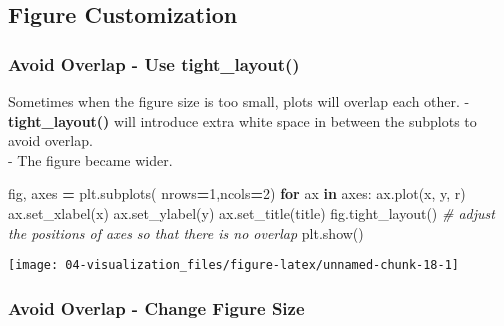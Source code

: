\documentclass[
]{book}
\newenvironment{Shaded}{\begin{snugshade}}{\end{snugshade}}
\newcommand{\CommentTok}[1]{\textcolor[rgb]{0.37,0.37,0.37}{\textit{#1}}}
\newcommand{\ControlFlowTok}[1]{\textcolor[rgb]{0.27,0.27,0.27}{\textbf{#1}}}
\newcommand{\DecValTok}[1]{\textcolor[rgb]{0.06,0.06,0.06}{#1}}
\newcommand{\KeywordTok}[1]{\textcolor[rgb]{0.27,0.27,0.27}{\textbf{#1}}}
\newcommand{\NormalTok}[1]{#1}
\newcommand{\OperatorTok}[1]{\textcolor[rgb]{0.43,0.43,0.43}{\textbf{#1}}}
\newcommand{\StringTok}[1]{\textcolor[rgb]{0.5,0.5,0.5}{#1}}
\begin{document}
\hypertarget{figure-customization}{%
\subsection{Figure Customization}\label{figure-customization}}

\hypertarget{avoid-overlap---use-tight_layout}{%
\subsubsection{Avoid Overlap - Use tight\_layout()}\label{avoid-overlap---use-tight_layout}}

Sometimes when the figure size is too small, plots will overlap each other. - \textbf{tight\_layout()} will introduce extra white space in between the subplots to avoid overlap.\\
- The figure became wider.

\begin{Shaded}
\begin{Highlighting}[]
\NormalTok{fig, axes }\OperatorTok{=}\NormalTok{ plt.subplots( nrows}\OperatorTok{=}\DecValTok{1}\NormalTok{,ncols}\OperatorTok{=}\DecValTok{2}\NormalTok{)}
\ControlFlowTok{for}\NormalTok{ ax }\KeywordTok{in}\NormalTok{ axes:}
\NormalTok{    ax.plot(x, y, }\StringTok{\textquotesingle{}r\textquotesingle{}}\NormalTok{)}
\NormalTok{    ax.set\_xlabel(}\StringTok{\textquotesingle{}x\textquotesingle{}}\NormalTok{)}
\NormalTok{    ax.set\_ylabel(}\StringTok{\textquotesingle{}y\textquotesingle{}}\NormalTok{)}
\NormalTok{    ax.set\_title(}\StringTok{\textquotesingle{}title\textquotesingle{}}\NormalTok{)}
\NormalTok{fig.tight\_layout() }\CommentTok{\# adjust the positions of axes so that there is no overlap}
\NormalTok{plt.show()}
\end{Highlighting}
\end{Shaded}

\texttt{[image: 04-visualization\_files/figure-latex/unnamed-chunk-18-1]}

\hypertarget{avoid-overlap---change-figure-size}{%
\subsubsection{Avoid Overlap - Change Figure Size}\label{avoid-overlap---change-figure-size}}
\end{document}
